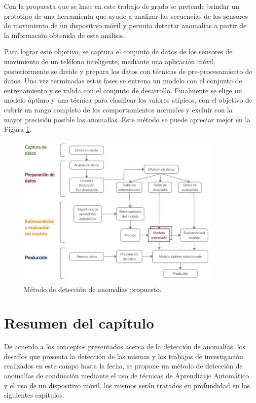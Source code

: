 \vspace{5mm} %

Con la propuesta que se hace en este trabajo de grado se pretende brindar un prototipo de una herramienta que ayude a analizar las secuencias de los sensores de movimiento de un dispositivo m\'{o}vil y permita detectar anomalías a partir de la información obtenida de este análisis. 

\vspace{5mm} %

Para lograr este objetivo, se captura el conjunto de datos de los sensores de movimiento de un tel\'{e}fono inteligente, mediante una aplicaci\'{o}n m\'{o}vil, posteriormente se divide y prepara los datos con t\'{e}cnicas de pre-procesamiento de datos. Una vez terminadas estas fases se entrena un modelo con el conjunto de entrenamiento y se valida con el conjunto de desarrollo. Finalmente se elige un modelo \'{o}ptimo y una t\'{e}cnica para clasificar los valores at\'{i}picos, con el objetivo de cubrir un rango completo de los comportamientos normales y excluir con la mayor precisi\'{o}n posible las anomal\'{i}as. Este m\'{e}todo se puede apreciar mejor en la Figura \ref{fig:modeloAnomalias}.

\begin{figure}[h!]
  \begin{center}	\includegraphics[width=0.90\textwidth]{imagenes/Cap2/metodo1}
  \caption{M\'{e}todo de detecci\'{o}n de anomal\'{i}as propuesto.}
  \label{fig:modeloAnomalias}
  \end{center}
\end{figure}

\section{Resumen del cap\'{i}tulo}

De acuerdo a los conceptos presentados acerca de la detecci\'{o}n de anomal\'{i}as, los desaf\'{i}os  que presenta la detecci\'{o}n de las mismas y los trabajos de investigaci\'{o}n realizados en este campo hasta la fecha, se propone un m\'{e}todo de detecci\'{o}n de anomal\'{i}as de conducci\'{o}n mediante el uso de t\'{e}cnicas de Aprendizaje Autom\'{a}tico y el uso de un dispositivo m\'{o}vil, los mismos ser\'{a}n tratados en profundidad en los siguientes cap\'{i}tulos. 